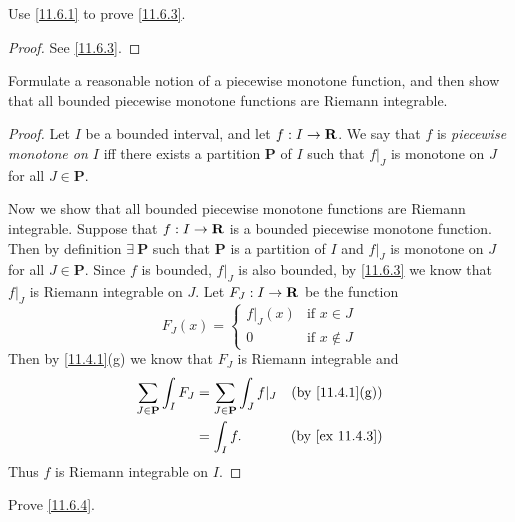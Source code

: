 \exercisesection

\begin{exercise}\label{ex 11.6.1}
  Use \cref{11.6.1} to prove \cref{11.6.3}.
\end{exercise}

\begin{proof}
  See \cref{11.6.3}.
\end{proof}

\begin{exercise}\label{ex 11.6.2}
  Formulate a reasonable notion of a piecewise monotone function, and then show that all bounded piecewise monotone functions are Riemann integrable.
\end{exercise}

\begin{proof}
  Let \(I\) be a bounded interval, and let \(f : I \to \mathbf{R}\).
  We say that \(f\) is \emph{piecewise monotone on \(I\)} iff there exists a partition \(\mathbf{P}\) of \(I\) such that \(f|_J\) is monotone on \(J\) for all \(J \in \mathbf{P}\).

  Now we show that all bounded piecewise monotone functions are Riemann integrable.
  Suppose that \(f : I \to \mathbf{R}\) is a bounded piecewise monotone function.
  Then by definition \(\exists\ \mathbf{P}\) such that \(\mathbf{P}\) is a partition of \(I\) and \(f|_J\) is monotone on \(J\) for all \(J \in \mathbf{P}\).
  Since \(f\) is bounded, \(f|_J\) is also bounded, by \cref{11.6.3} we know that \(f|_J\) is Riemann integrable on \(J\).
  Let \(F_J : I \to \mathbf{R}\) be the function
  \[
    F_J(x) = \begin{cases}
      f|_J(x) & \text{if } x \in J    \\
      0       & \text{if } x \notin J
    \end{cases}
  \]
  Then by \cref{11.4.1}(g) we know that \(F_J\) is Riemann integrable and
  \begin{align*}
    \sum_{J \in \mathbf{P}} \int_I F_J & = \sum_{J \in \mathbf{P}} \int_J f|_J & \text{(by \cref{11.4.1}(g))} \\
                                       & = \int_I f.                           & \text{(by \cref{ex 11.4.3})}
  \end{align*}
  Thus \(f\) is Riemann integrable on \(I\).
\end{proof}

\begin{exercise}\label{ex 11.6.3}
  Prove \cref{11.6.4}.
\end{exercise}

